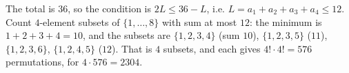 The total is $36$, so the condition is $2L\le36-L$, i.e. $L=a_1+a_2+a_3+a_4\le12$. Count $4$-element subsets of $\{1,\dots,8\}$ with sum at most $12$: the minimum is $1+2+3+4=10$, and the subsets are $\{1,2,3,4\}$ (sum $10$), $\{1,2,3,5\}$ ($11$), $\{1,2,3,6\}$, $\{1,2,4,5\}$ ($12$). That is $4$ subsets, and each gives $4!\cdot4!=576$ permutations, for $4\cdot576=\boxed{2304}$.
